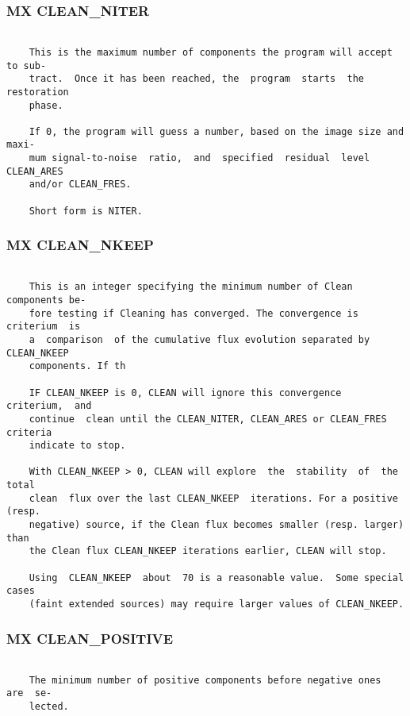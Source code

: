\subsubsection{MX CLEAN\_NITER}
\begin{verbatim}

    This is the maximum number of components the program will accept to sub-
    tract.  Once it has been reached, the  program  starts  the  restoration
    phase.

    If 0, the program will guess a number, based on the image size and maxi-
    mum signal-to-noise  ratio,  and  specified  residual  level  CLEAN_ARES
    and/or CLEAN_FRES.

    Short form is NITER.

\end{verbatim}
\subsubsection{MX CLEAN\_NKEEP}
\begin{verbatim}

    This is an integer specifying the minimum number of Clean components be-
    fore testing if Cleaning has converged. The convergence is criterium  is
    a  comparison  of the cumulative flux evolution separated by CLEAN_NKEEP
    components. If th

    IF CLEAN_NKEEP is 0, CLEAN will ignore this convergence  criterium,  and
    continue  clean until the CLEAN_NITER, CLEAN_ARES or CLEAN_FRES criteria
    indicate to stop.

    With CLEAN_NKEEP > 0, CLEAN will explore  the  stability  of  the  total
    clean  flux over the last CLEAN_NKEEP  iterations. For a positive (resp.
    negative) source, if the Clean flux becomes smaller (resp. larger)  than
    the Clean flux CLEAN_NKEEP iterations earlier, CLEAN will stop.

    Using  CLEAN_NKEEP  about  70 is a reasonable value.  Some special cases
    (faint extended sources) may require larger values of CLEAN_NKEEP.

\end{verbatim}
\subsubsection{MX CLEAN\_POSITIVE}
\begin{verbatim}

    The minimum number of positive components before negative ones  are  se-
    lected.

\end{verbatim}

